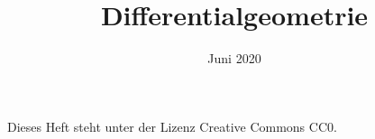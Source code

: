 \documentclass[a4paper,fleqn,11pt,dvipdfmx]{scrbook}
\title{Differentialgeometrie}
\date{Juni 2020}
\theoremstyle{rmbox}
\numberwithin{definition}{chapter}
\numberwithin{theorem}{chapter}
\begin{document}
\thispagestyle{empty}

\maketitle

Dieses Heft steht unter der Lizenz Creative Commons CC0.

\tableofcontents







\printindex
\end{document}
